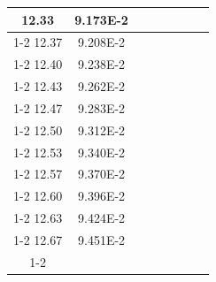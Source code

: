 \documentclass[article,12pt]{elsarticle}
\begin{document}
\begin{longtable}[c]{|c|c|cccccc}
12.33    & 9.173E-2  &                       &                              &                            &                       &                              &                               \\ \cline{1-2}
12.37    & 9.208E-2  &                       &                              &                            &                       &                              &                               \\ \cline{1-2}
12.40    & 9.238E-2  &                       &                              &                            &                       &                              &                               \\ \cline{1-2}
12.43    & 9.262E-2  &                       &                              &                            &                       &                              &                               \\ \cline{1-2}
12.47    & 9.283E-2  &                       &                              &                            &                       &                              &                               \\ \cline{1-2}
12.50    & 9.312E-2  &                       &                              &                            &                       &                              &                               \\ \cline{1-2}
12.53    & 9.340E-2  &                       &                              &                            &                       &                              &                               \\ \cline{1-2}
12.57    & 9.370E-2  &                       &                              &                            &                       &                              &                               \\ \cline{1-2}
12.60    & 9.396E-2  &                       &                              &                            &                       &                              &                               \\ \cline{1-2}
12.63    & 9.424E-2  &                       &                              &                            &                       &                              &                               \\ \cline{1-2}
12.67    & 9.451E-2  &                       &                              &                            &                       &                              &                               \\ \cline{1-2}

\end{longtable}
\end{document}
